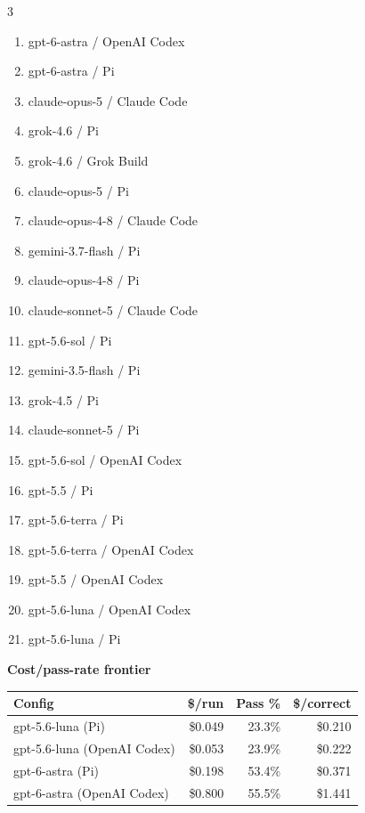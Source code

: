 \documentclass[11pt]{article}
\begin{document}
\begin{figure}[p]
\begin{multicols}{3}\footnotesize
\begin{enumerate}[itemsep=0pt,parsep=0pt,topsep=0pt,leftmargin=1.6em]
\item gpt-6-astra / OpenAI Codex
\item gpt-6-astra / Pi
\item claude-opus-5 / Claude Code
\item grok-4.6 / Pi
\item grok-4.6 / Grok Build
\item claude-opus-5 / Pi
\item claude-opus-4-8 / Claude Code
\item gemini-3.7-flash / Pi
\item claude-opus-4-8 / Pi
\item claude-sonnet-5 / Claude Code
\item gpt-5.6-sol / Pi
\item gemini-3.5-flash / Pi
\item grok-4.5 / Pi
\item claude-sonnet-5 / Pi
\item gpt-5.6-sol / OpenAI Codex
\item gpt-5.5 / Pi
\item gpt-5.6-terra / Pi
\item gpt-5.6-terra / OpenAI Codex
\item gpt-5.5 / OpenAI Codex
\item gpt-5.6-luna / OpenAI Codex
\item gpt-5.6-luna / Pi
\end{enumerate}
\end{multicols}
\smallskip
\begin{center}\textbf{Cost/pass-rate frontier}\end{center}\smallskip
\begin{center}
\small
\begin{tabular}{lrrr}
\toprule
Config & \$/run & Pass \% & \$/correct \\
\midrule
gpt-5.6-luna (Pi) & \$0.049 & 23.3\% & \$0.210
\\
gpt-5.6-luna (OpenAI Codex) & \$0.053 & 23.9\% & \$0.222
\\
gpt-6-astra (Pi) & \$0.198 & 53.4\% & \$0.371
\\
gpt-6-astra (OpenAI Codex) & \$0.800 & 55.5\% & \$1.441
\\
\bottomrule
\end{tabular}
\end{center}


\end{figure}
\end{document}
